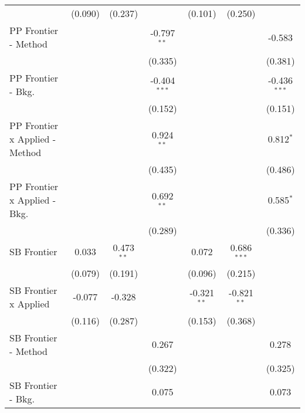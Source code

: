 \begin{tabular}{lcccccc}
                                  & (0.090)       & (0.237)       &                & (0.101)        & (0.250)       &   \\   
   PP Frontier - Method           &               &               & -0.797$^{**}$  &                &               & -0.583\\   
                                  &               &               & (0.335)        &                &               & (0.381)\\   
   PP Frontier - Bkg.             &               &               & -0.404$^{***}$ &                &               & -0.436$^{***}$\\   
                                  &               &               & (0.152)        &                &               & (0.151)\\   
   PP Frontier x Applied - Method &               &               & 0.924$^{**}$   &                &               & 0.812$^{*}$\\   
                                  &               &               & (0.435)        &                &               & (0.486)\\   
   PP Frontier x Applied - Bkg.   &               &               & 0.692$^{**}$   &                &               & 0.585$^{*}$\\   
                                  &               &               & (0.289)        &                &               & (0.336)\\   
   SB Frontier                    & 0.033         & 0.473$^{**}$  &                & 0.072          & 0.686$^{***}$ &   \\   
                                  & (0.079)       & (0.191)       &                & (0.096)        & (0.215)       &   \\   
   SB Frontier x Applied          & -0.077        & -0.328        &                & -0.321$^{**}$  & -0.821$^{**}$ &   \\   
                                  & (0.116)       & (0.287)       &                & (0.153)        & (0.368)       &   \\   
   SB Frontier - Method           &               &               & 0.267          &                &               & 0.278\\   
                                  &               &               & (0.322)        &                &               & (0.325)\\   
   SB Frontier - Bkg.             &               &               & 0.075          &                &               & 0.073\\   

\end{tabular}
